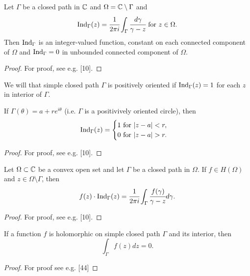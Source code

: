 \documentclass[main.tex]{subfiles}
\begin{document}
\begin{theorem}
Let $\Gamma$ be a closed path in $\mathbb{C}$ and $\Omega = \mathbb{C}\setminus \Gamma$ and
\begin{equation}
\operatorname{Ind}_\Gamma(z) = \cfrac{1}{2\pi i} \int_\Gamma \cfrac{d\gamma}{\gamma - z} \text{ for } z\in\Omega. 
\end{equation}
Then $\operatorname{Ind}_\Gamma$ is an integer-valued function, constant on each connected component of $\Omega$ and $\operatorname{Ind}_\Gamma = 0$ in unbounded connected component of $\Omega$. 
\end{theorem}
\begin{proof}
For proof, see e.g. \cite{rudin1987}[10].
\end{proof}

We will that simple closed path $\Gamma$ is positively oriented if $\operatorname{Ind}_\Gamma(z) = 1$ for each $z$ in interior of $\Gamma$. 

\begin{theorem}
If $\Gamma(\theta) = a + re^{i\theta}$ (i.e. $\Gamma$ is a positivively oriented circle), then
\begin{equation}
\operatorname{Ind}_\Gamma(z) = 
\begin{cases}
1 \text{ for } |z - a| < r,\\
0 \text{ for } |z - a| > r.
\end{cases}
\end{equation}
\end{theorem}

\begin{proof}
For proof, see e.g. \cite{rudin1987}[10].
\end{proof}

\begin{theorem}
\label{cauchy-convex}
Let $\Omega \subset \mathbb{C}$ be a convex open set and let $\Gamma$ be a closed path in $\Omega$. If $f\in H(\Omega)$ and $z\in \Omega\setminus \Gamma$, then
\begin{equation}
f(z) \cdot \operatorname{Ind}_\Gamma(z) = \cfrac{1}{2\pi i} \int_\Gamma \cfrac{f(\gamma)}{\gamma - z}d\gamma.
\end{equation}
\end{theorem}
\begin{proof}
For proof, see e.g. \cite{rudin1987}[10].
\end{proof}

\begin{theorem}
If a function $f$ is holomorphic on simple closed path $\Gamma$ and its interior, then
\begin{equation}
\int_\Gamma f(z) dz = 0.
\end{equation} 
\end{theorem}
\begin{proof}
For proof see e.g. \cite{brown2003}[44]
\end{proof}
\end{document}
